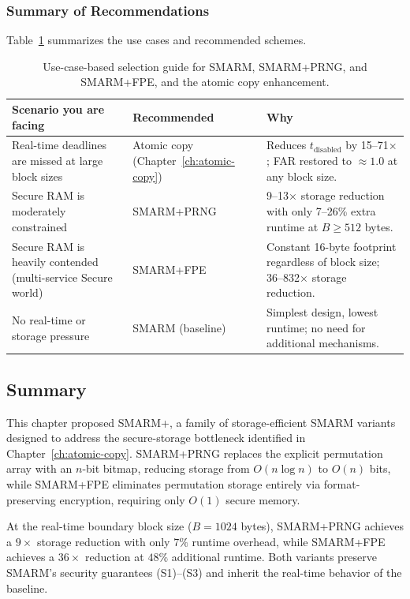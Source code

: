 \documentclass[a4paper,10pt]{article}
\begin{document}
{\subsubsection{Summary of Recommendations}

Table~\ref{tab:deployment_scenarios} summarizes the use cases 
and recommended schemes.

\begin{table}[H]
\centering
\caption{Use-case-based selection guide for SMARM, SMARM+PRNG, 
and SMARM+FPE, and the atomic copy enhancement.}
\label{tab:deployment_scenarios}
\small
\begin{tabular}{p{4.0cm}p{3.6cm}p{6.0cm}}
\toprule
\textbf{Scenario you are facing} & \textbf{Recommended} 
& \textbf{Why} \\
\midrule
Real-time deadlines are missed at large block sizes 
& Atomic copy 
(Chapter~\ref{ch:atomic-copy}) 
& Reduces $t_{\mathrm{disabled}}$ by 15--71$\times$; FAR 
restored to $\approx 1.0$ at any block size. \\
\addlinespace
Secure RAM is moderately constrained 
& SMARM+PRNG 
& 9--13$\times$ storage reduction with only 7--26\% extra 
runtime at $B \geq 512$ bytes. \\
\addlinespace
Secure RAM is heavily contended (multi-service Secure world) 
& SMARM+FPE 
& Constant 16-byte footprint regardless of block size; 
36--832$\times$ storage reduction. \\
\addlinespace
No real-time or storage pressure 
& SMARM (baseline) 
& Simplest design, lowest runtime; no need for additional 
mechanisms. \\
\bottomrule
\end{tabular}
\end{table}


\subsection{Summary}
\label{sec:smarmplus-summary}

This chapter proposed SMARM+, a family of storage-efficient SMARM 
variants designed to address the secure-storage bottleneck 
identified in Chapter~\ref{ch:atomic-copy}. 
SMARM+PRNG replaces the explicit permutation 
array with an $n$-bit bitmap, reducing storage from 
$O(n \log n)$ to $O(n)$ bits, while 
SMARM+FPE eliminates permutation storage 
entirely via format-preserving encryption, requiring only 
$O(1)$ secure memory.

At the real-time boundary block size ($B = 1024$ bytes), 
SMARM+PRNG achieves a $9\times$ storage reduction 
with only $7\%$ runtime overhead, while 
SMARM+FPE achieves a $36\times$ reduction at 
$48\%$ additional runtime. Both variants preserve SMARM's 
security guarantees (S1)--(S3) and inherit the real-time 
behavior of the baseline.

}
\end{document}
